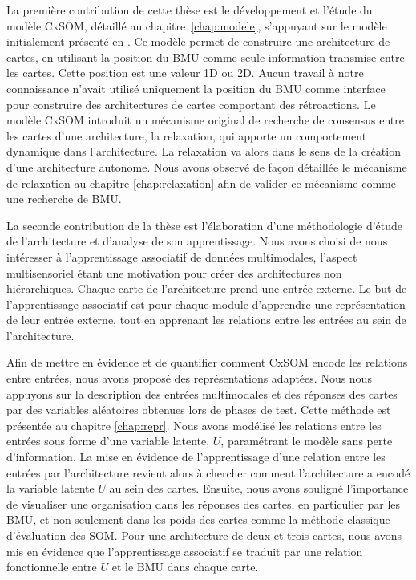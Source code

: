 La première contribution de cette thèse est le développement et l'étude du modèle CxSOM, détaillé au chapitre~\ref{chap:modele}, s'appuyant sur le modèle initialement présenté en \cite{baheux_towards_2014}.
Ce modèle permet de construire une architecture de cartes, en utilisant la position du BMU comme seule information transmise entre les cartes. 
Cette position est une valeur 1D ou 2D. Aucun travail à notre connaissance n'avait utilisé uniquement la position du BMU comme interface pour construire des architectures de cartes comportant des rétroactions.
Le modèle CxSOM introduit un mécanisme original de recherche de consensus entre les cartes d'une architecture, la relaxation, qui apporte un comportement dynamique dans l'architecture.
La relaxation va alors dans le sens de la création d'une architecture autonome.
Nous avons observé de façon détaillée le mécanisme de relaxation au chapitre \ref{chap:relaxation} afin de valider ce mécanisme comme une recherche de BMU.

La seconde contribution de la thèse est l'élaboration d'une méthodologie d'étude de l'architecture et d'analyse de son apprentissage. 
Nous avons choisi de nous intéresser à l'apprentissage associatif de données multimodales, l'aspect multisensoriel étant une motivation pour créer des architectures non hiérarchiques. Chaque carte de l'architecture prend une entrée externe. 
Le but de l'apprentissage associatif est pour chaque module d'apprendre une représentation de leur entrée externe, tout en apprenant les relations entre les entrées au sein de l'architecture.


Afin de mettre en évidence et de quantifier comment CxSOM encode les relations entre entrées, nous avons proposé des représentations adaptées. Nous nous appuyons sur la description des entrées multimodales et des réponses des cartes par des variables aléatoires obtenues lors de phases de test. Cette méthode est présentée au chapitre \ref{chap:repr}.
Nous avons modélisé les relations entre les entrées sous forme d'une variable latente, $U$, paramétrant le modèle sans perte d'information. La mise en évidence de l'apprentissage d'une relation entre les entrées par l'architecture revient alors à chercher comment l'architecture a encodé la variable latente $U$ au sein des cartes.
Ensuite, nous avons souligné l'importance de visualiser une organisation dans les réponses des cartes, en particulier par les BMU, et non seulement dans les poids des cartes comme la méthode classique d'évaluation des SOM.
Pour une architecture de deux et trois cartes, nous avons mis en évidence que l'apprentissage associatif se traduit par une relation fonctionnelle entre $U$ et le BMU dans chaque carte. 


